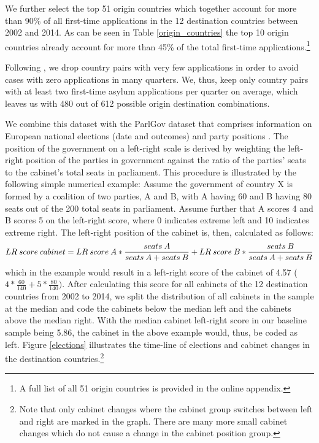 \documentclass[a4paper,12pt]{article}
\begin{document}


We further select the top 51 origin countries which together account for more than 90\% of all first-time applications in the 12 destination countries between 2002 and 2014. As can be seen in Table \ref{origin_countries} the top 10 origin countries already account for more than 45\% of the total first-time applications.\footnote{A full list of all 51 origin countries is provided in the online appendix.}



Following \cite{hatton2016}, we drop country pairs with very few applications in order to avoid cases with zero applications in many quarters. We, thus, keep only country pairs with at least two first-time asylum applications per quarter on average, which leaves us with 480 out of 612 possible origin destination combinations.

We combine this dataset with the ParlGov dataset that comprises information on European national elections (date and outcomes) and party positions \citep{parlgov2016}. The position of the government on a left-right scale is derived by weighting the left-right position of the parties in government  against the ratio of the parties' seats to the cabinet's total seats in parliament. This procedure is illustrated by the following simple numerical example: Assume the government of country X is formed by a coalition of two parties, A and B, with A having 60 and B having 80 seats out of the 200 total seats in parliament. Assume further that A scores 4 and B scores 5 on the left-right score, where 0 indicates extreme left and 10 indicates extreme right. The left-right position of the cabinet is, then, calculated as follows: 
\begin{equation*}
\tiny
LR~score~cabinet = LR~score~A * \frac{seats~A}{seats~A + seats~B} +LR~score~B * \frac{seats~B}{seats~A + seats~B} 
\end{equation*}which in the example would result in a left-right score of the cabinet of 4.57 ($4*\frac{60}{140} +5*\frac{80}{140})$.
After calculating this score for all cabinets of the 12 destination countries from 2002 to 2014, we split the distribution of all cabinets in the sample at the median and code the cabinets below the median left and the cabinets above the median right. With the median cabinet left-right score in our baseline sample being 5.86, the cabinet in the above example would, thus, be coded as left. 
Figure \ref{elections} illustrates the time-line of elections and cabinet changes in the destination countries.\footnote{Note that only cabinet changes where the cabinet group switches between left and right are marked in the graph. There are many more small cabinet changes which do not cause a change in the cabinet position group.}
\end{document}
